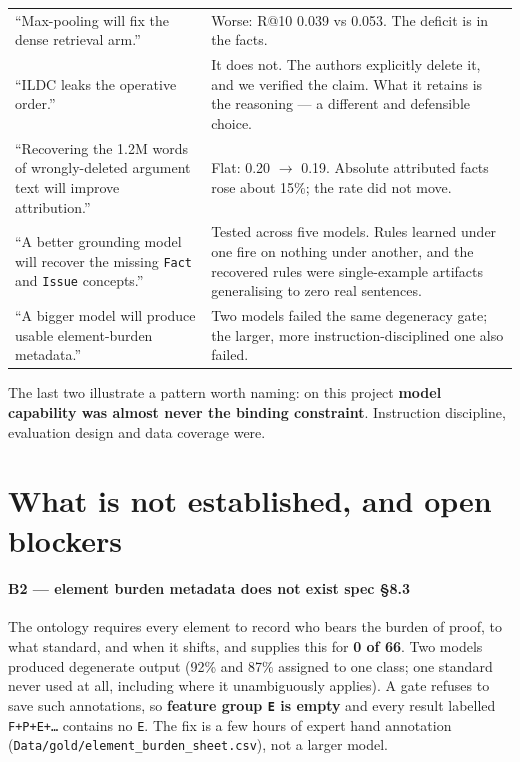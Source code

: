 \documentclass[12pt,a4paper]{article}
\newcommand{\code}[1]{\texttt{\small #1}}
\newcommand{\spec}[1]{\textbf{spec §#1}}
\begin{document}
\begin{center}
{\begin{tabular}{@{}p{5.2cm}p{8.8cm}@{}}
\addlinespace
``Max-pooling will fix the dense retrieval arm.''
 & Worse: R@10 0.039 vs 0.053. The deficit is in the facts. \\
\addlinespace
``ILDC leaks the operative order.''
 & It does not. The authors explicitly delete it, and we verified the claim. What it retains is the
   reasoning --- a different and defensible choice. \\
\addlinespace
``Recovering the 1.2M words of wrongly-deleted argument text will improve attribution.''
 & Flat: 0.20 $\rightarrow$ 0.19. Absolute attributed facts rose about 15\%; the rate did not move. \\
\addlinespace
``A better grounding model will recover the missing \code{Fact} and \code{Issue} concepts.''
 & Tested across five models. Rules learned under one fire on nothing under another, and the
   recovered rules were single-example artifacts generalising to zero real sentences. \\
\addlinespace
``A bigger model will produce usable element-burden metadata.''
 & Two models failed the same degeneracy gate; the larger, more instruction-disciplined one
   also failed. \\
\bottomrule
\end{tabular}}
\end{center}

\noindent
The last two illustrate a pattern worth naming: on this project \textbf{model capability was almost
never the binding constraint}. Instruction discipline, evaluation design and data coverage were.

\section{What is not established, and open blockers}\label{sec:blockers}

\paragraph{B2 --- element burden metadata does not exist \spec{8.3}} The ontology requires every
element to record who bears the burden of proof, to what standard, and when it shifts, and supplies
this for \textbf{0 of 66}. Two models produced degenerate output (92\% and 87\% assigned to one
class; one standard never used at all, including where it unambiguously applies). A gate refuses to
save such annotations, so \textbf{feature group \code{E} is empty} and every result labelled
\code{F+P+E+\ldots} contains no \code{E}. The fix is a few hours of expert hand annotation
(\code{Data/gold/element\_burden\_sheet.csv}), not a larger model.
\end{document}
